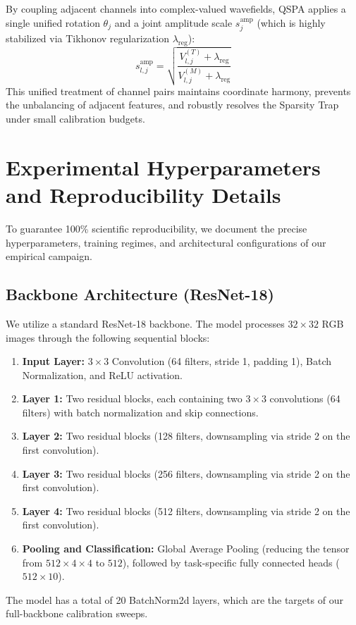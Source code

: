 \documentclass{article}
\begin{document}
By coupling adjacent channels into complex-valued wavefields, QSPA applies a single unified rotation $\theta_j$ and a joint amplitude scale $s^{\text{amp}}_j$ (which is highly stabilized via Tikhonov regularization $\lambda_{\text{reg}}$):
\begin{equation}
    s^{\text{amp}}_{l, j} = \sqrt{\frac{V^{(T)}_{l, j} + \lambda_{\text{reg}}}{V^{(M)}_{l, j} + \lambda_{\text{reg}}}}
\end{equation}
This unified treatment of channel pairs maintains coordinate harmony, prevents the unbalancing of adjacent features, and robustly resolves the Sparsity Trap under small calibration budgets.

\section{Experimental Hyperparameters and Reproducibility Details}
\label{appendix:reproducibility}

To guarantee 100\% scientific reproducibility, we document the precise hyperparameters, training regimes, and architectural configurations of our empirical campaign.

\subsection{Backbone Architecture (ResNet-18)}
We utilize a standard ResNet-18 backbone. The model processes $32 \times 32$ RGB images through the following sequential blocks:
\begin{enumerate}
    \item \textbf{Input Layer:} $3 \times 3$ Convolution (64 filters, stride 1, padding 1), Batch Normalization, and ReLU activation.
    \item \textbf{Layer 1:} Two residual blocks, each containing two $3\times3$ convolutions (64 filters) with batch normalization and skip connections.
    \item \textbf{Layer 2:} Two residual blocks (128 filters, downsampling via stride 2 on the first convolution).
    \item \textbf{Layer 3:} Two residual blocks (256 filters, downsampling via stride 2 on the first convolution).
    \item \textbf{Layer 4:} Two residual blocks (512 filters, downsampling via stride 2 on the first convolution).
    \item \textbf{Pooling and Classification:} Global Average Pooling (reducing the tensor from $512 \times 4 \times 4$ to $512$), followed by task-specific fully connected heads ($512 \times 10$).
\end{enumerate}
The model has a total of 20 BatchNorm2d layers, which are the targets of our full-backbone calibration sweeps.
\end{document}
